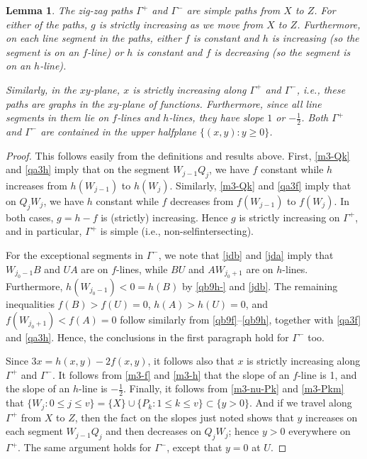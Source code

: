 \documentclass[11pt,reqno,tbtags,a4paper]{amsart}
\numberwithin{equation}{section}
\renewcommand\le{\leq}
\renewcommand\ge{\geq}
\renewcommand\leq{\leqslant}
\renewcommand\geq{\geqslant}
\theoremstyle{plain}%
\newtheorem{lemma}[theorem]{Lemma}
\theoremstyle{definition}
\theoremstyle{remark}
\newcounter{cases}
\newcommand\set[1]{\ensuremath{\{#1\}}}
\newcommand\gG{\Gamma}
\newcommand\0{{\boldsymbol 0}}
\newcommand\1{{\boldsymbol 1}}
\begin{document}
\begin{lemma}\label{LQ5}
 The zig-zag paths\/ $\gG^+$ and $\gG^-$  are  simple paths from $X$ to $Z$.
For either of the paths, $g$ is strictly increasing as we move
from $X$ to $Z$. 
Furthermore, on each line segment in the paths, either
$f$ is constant and $h$ is increasing (so the segment is on an $f$-line)
or
$h$ is constant and $f$ is decreasing (so the segment is on an $h$-line).

Similarly, in the $xy$-plane,
$x$
is strictly increasing  along $\gG^+$ and $\gG^-$, i.e., these paths are
graphs in the $xy$-plane of functions. 
Furthermore, since all line segments in them lie on $f$-lines and
$h$-lines, they have slope $1$ or $-\frac12$. %
Both $\gG^+$ and $\gG^-$ are contained in the upper halfplane
$\set{(x,y):y\ge0}$.
\end{lemma}
\begin{proof}
  This follows easily from the definitions and results above.
First, \eqref{m3-Qk} and \eqref{qa3h}
imply that on the segment $W_{j-1}Q_j$,
we have $f$ constant while $h$ increases from $h(W_{j-1})$ to $h(W_j)$.
%
Similarly, \eqref{m3-Qk} and \eqref{qa3f} imply that
on %
$Q_jW_{j}$,
we have $h$ constant while $f$ decreases from $f(W_{j-1})$ to $f(W_j)$.
In both cases, $g=h-f$ is (strictly) increasing.
Hence $g$ is strictly increasing on $\gG^+$, and in particular, $\gG^+$ is
simple (i.e., non-selfintersecting).

For the exceptional segments
%
%
%
%
in $\gG^-$, we note that \eqref{jdb} and \eqref{jda} imply that
$W_{j_0-1}B$ and $UA$ are on $f$-lines, while
$BU$ and $AW_{j_0+1}$ are on $h$-lines.
Furthermore, $h(W_{j_0-1})<0=h(B)$ by \eqref{qb9h-} and \eqref{jdb}.
The remaining inequalities $f(B)>f(U)=0$, $h(A)>h(U)=0$, 
and $f(W_{j_0+1})<f(A)=0$
follow similarly from \eqref{qb9f}--\eqref{qb9h},
together with
\eqref{qa3f} and \eqref{qa3h}.
Hence, the conclusions in the first paragraph hold for $\gG^-$ too.


Since $3x=h(x,y)-2f(x,y)$, it follows also that $x$ is strictly increasing
along $\gG^+$ and $\gG^-$. It follows from \eqref{m3-f} and \eqref{m3-h}
that the slope of an $f$-line is 1,
and the slope of an $h$-line is $-\frac12$.
Finally, 
it follows from \eqref{m3-nu-Pk} and \eqref{m3-Pkm} that
$\set{W_j:0\le j\le v}=\set X \cup\set{P_k:1\le k\le v}
\subset\set{y>0}$. 
And if we travel along $\gG^+$ from $X$ to $Z$, then the fact
on the slopes just noted shows that 
%
$y$ increases on each segment $W_{j-1}Q_j$ and then
decreases on $Q_jW_j$; hence $y>0$ everywhere on $\gG^+$.
The same argument holds for $\gG^-$, except that $y=0$ at $U$.
\end{proof}
\end{document}
